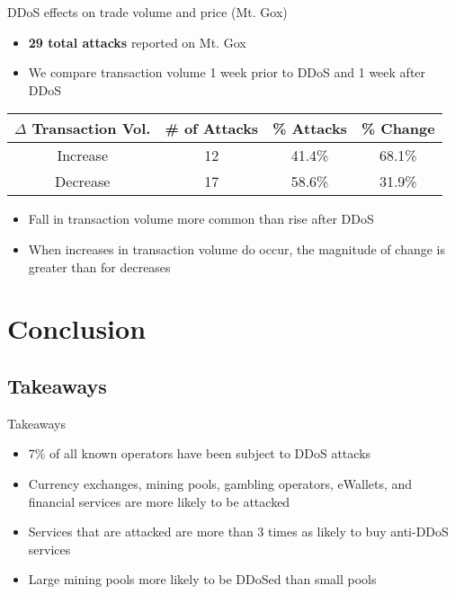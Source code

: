 \documentclass{beamer}
\begin{document}
\begin{frame}{DDoS effects on trade volume and price (Mt. Gox)}

\begin{itemize}
	\item \textbf{29 total attacks} reported on Mt. Gox
	\item We compare transaction volume 1 week prior to DDoS and 1 week after DDoS
\end{itemize}
\begin{tabular}{| c | c | c | c |}
	\hline
	\textbf{$\Delta$ Transaction Vol.} & \textbf{\# of Attacks} & \textbf{\% Attacks} &\textbf{\% Change}\\
	\hline
	\hline
	Increase & 12 & 41.4\% & 68.1\%\\
	\hline	
	Decrease & 17 & 58.6\% & 31.9\%\\
	\hline 
\end{tabular}
\begin{itemize}
	\item Fall in transaction volume more common than rise after DDoS
        \item When increases in transaction volume do occur, the magnitude of change is greater than for decreases 
\end{itemize}
\end{frame}


\section{Conclusion}
\subsection{Takeaways}
\begin{frame}{Takeaways}
\begin{itemize}
	\item 7\% of all known operators have been subject to DDoS attacks
	\item Currency exchanges, mining pools, gambling operators, eWallets, and financial services are more likely to be attacked
	\item Services that are attacked are more than 3 times as likely to buy anti-DDoS services
        \item Large mining pools more likely to be DDoSed than small pools
\end{itemize}
\end{frame}
\end{document}
